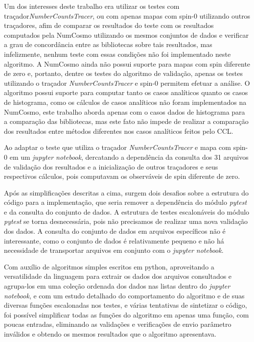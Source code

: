 Um dos interesses deste trabalho era utilizar os testes com traçador\textit{NumberCountsTracer}, ou com apenas mapas com spin-0 utilizando outros traçadores, afim de comparar os resultados do teste com os resultados computados pela NumCosmo utilizando os mesmos conjuntos de dados e verificar a grau de concordância entre as bibliotecas sobre tais resultados, mas infelizmente, nenhum teste com essas condições não foi implementado neste algoritmo. A NumCosmo ainda não possui suporte para mapas com spin diferente de zero e, portanto, dentre os testes do algoritmo de validação, apenas os testes utilizando o traçador  \textit{NumberCountsTracer} e spin-0 permitem efetuar a análise. O algoritmo possui suporte para computar tanto os casos analíticos quanto os casos de histograma, como os cálculos de casos analíticos não foram implementados na NumCosmo, este trabalho aborda apenas com o casos dados de histograma para a comparação das bibliotecas, mas este fato não impede de realizar a comparação dos resultados entre métodos diferentes nos casos analíticos feitos pelo CCL.

Ao adaptar o teste que utiliza o traçador \textit{NumberCountsTracer} e mapa com spin-0 em um \textit{jupyter notebook}, dercatando a dependência da consulta dos 31 arquivos de validação dos resultados e a inicialização de outros traçadores e seus respectivos cálculos, pois computavam os observáveis de spin diferente de zero.
 
Após as simplificações descritas a cima, surgem dois desafios sobre a estrutura do código para a implementação, que seria remover a dependência do módulo \textit{pytest} e da consulta do conjunto de dados. A estrutura de testes escalonáveis do módulo \textit{pytest} se torna desnecessária, pois não precisamos de realizar uma nova validação dos dados. A consulta do conjunto de dados em arquivos específicos não é interessante, como o conjunto de dados é relativamente pequeno e não há necessidade de transportar arquivos em conjunto com o \textit{jupyter notebook}.

Com auxílio de algoritmos simples escritos em python, aproveitando a versatilidade da linguagem para extrair os dados dos arquivos consultados e agrupa-los em uma coleção ordenada dos dados nas listas dentro do \textit{jupyter notebook}, e com um estudo detalhado do comportamento do algoritmo e de suas diversas funções escalonadas nos testes, e várias tentativas de sintetizar o código, foi possível simplificar todas as funções do algoritmo em apenas uma função, com poucas entradas, eliminando as validações e verificações de envio parâmetro inválidos e obtendo os mesmos resultados que o algoritmo apresentava.

